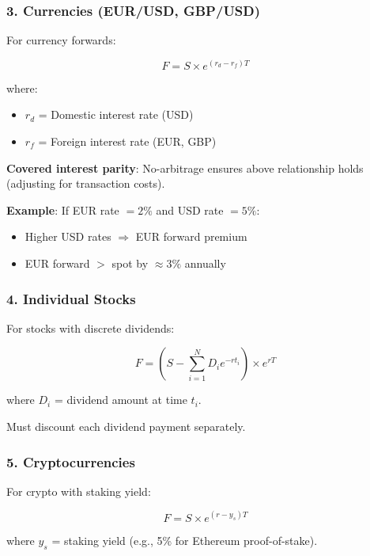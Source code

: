 \documentclass[12pt,a4paper]{article}
\begin{document}
\subsubsection{3. Currencies (EUR/USD, GBP/USD)}

For currency forwards:

\begin{equation}
F = S \times e^{(r_d - r_f)T}
\end{equation}

where:
\begin{itemize}
    \item $r_d$ = Domestic interest rate (USD)
    \item $r_f$ = Foreign interest rate (EUR, GBP)
\end{itemize}

\textbf{Covered interest parity}: No-arbitrage ensures above relationship holds (adjusting for transaction costs).

\textbf{Example}: If EUR rate $= 2\%$ and USD rate $= 5\%$:
\begin{itemize}
    \item Higher USD rates $\Rightarrow$ EUR forward premium
    \item EUR forward $>$ spot by $\approx 3\%$ annually
\end{itemize}

\subsubsection{4. Individual Stocks}

For stocks with discrete dividends:

\begin{equation}
F = \left(S - \sum_{i=1}^{N} D_i e^{-r t_i}\right) \times e^{r T}
\end{equation}

where $D_i$ = dividend amount at time $t_i$.

Must discount each dividend payment separately.

\subsubsection{5. Cryptocurrencies}

For crypto with staking yield:

\begin{equation}
F = S \times e^{(r - y_s)T}
\end{equation}

where $y_s$ = staking yield (e.g., 5\% for Ethereum proof-of-stake).
\end{document}
